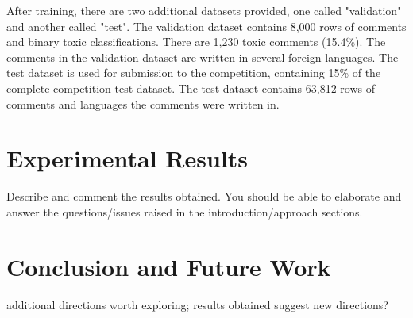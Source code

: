 \documentclass{article}
\begin{document}
After training, there are two additional datasets provided, one called "validation" and another called "test". The validation dataset contains 8,000 rows of comments and binary toxic classifications. There are 1,230 toxic comments (15.4\%). The comments in the validation dataset are written in several foreign languages. The test dataset is used for submission to the competition, containing 15\% of the complete competition test dataset. The test dataset contains 63,812 rows of comments and languages the comments were written in.



\section{Experimental Results}

Describe and comment the results
obtained. You should be able to elaborate and answer the
questions/issues raised in the introduction/approach sections.

\section{Conclusion and Future Work}

additional directions worth
exploring; results obtained suggest new directions?

\begin{footnotesize}


\end{footnotesize}%
\end{document}

